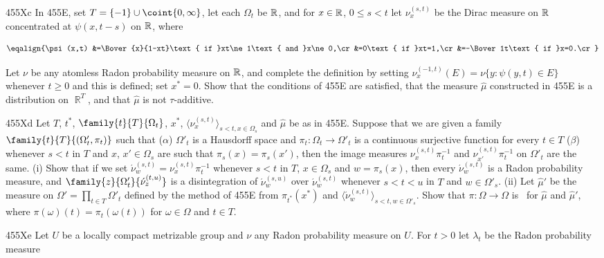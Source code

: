 {\spheader 455Xc
In 455E, set $T=\{-1\}\cup\coint{0,\infty}$, let each
$\Omega_t$ be $\Bbb R$, and for $x\in\Bbb R$,
$0\le s<t$ let $\nu_x^{(s,t)}$ be the Dirac measure on $\Bbb R$
concentrated at $\psi(x,t-s)$ on $\Bbb R$, where

$$\eqalign{\psi(x,t)
&=\Bover{x}{1-xt}\text{ if }xt\ne 1\text{ and }x\ne 0,\cr
&=0\text{ if }xt=1,\cr
&=-\Bover1t\text{ if }x=0.\cr}$$

\noindent Let $\nu$ be any atomless Radon probability measure on
$\Bbb R$, and complete the definition by setting
$\nu_x^{(-1,t)}(E)=\nu\{y:\psi(y,t)\in E\}$ whenever $t\ge 0$ and this is
defined;  set $x^*=0$.
Show that the conditions of 455E are satisfied, that the
measure $\hat\mu$ constructed in 455E is a distribution on $\BbbR^T$, and
that $\hat\mu$ is not $\tau$-additive.   

\spheader 455Xd Let $T$, $t^*$, $\family{t}{T}{\Omega_t}$, $x^*$,
$\langle\nu^{(s,t)}_x\rangle_{s<t,x\in\Omega_s}$ and
$\hat\mu$ be as in 455E.   Suppose that we are given a family
$\family{t}{T}{(\Omega'_t,\pi_t)}$ such
that ($\alpha$) $\Omega'_t$ is a Hausdorff space and
$\pi_t:\Omega_t\to\Omega'_t$ is a continuous surjective
function for every $t\in T$
($\beta$) whenever $s<t$ in $T$ and $x$, $x'\in\Omega_s$ are such that
$\pi_s(x)=\pi_s(x')$, then the image measures $\nu^{(s,t)}_x\pi_t^{-1}$
and $\nu^{(s,t)}_{x'}\pi_t^{-1}$ on $\Omega'_t$ are the same.
(i) Show that if we set $\acute\nu^{(s,t)}_w=\nu^{(s,t)}_x\pi_t^{-1}$
whenever $s<t$ in $T$, $x\in\Omega_s$ and $w=\pi_s(x)$,
then every $\acute\nu^{(s,t)}_w$ is a Radon probability measure, and
$\family{z}{\Omega'_t}{\acute\nu^{(t,u)}_z}$ is a disintegration of
$\acute\nu^{(s,u)}_w$ over $\acute\nu^{(s,t)}_w$ whenever $s<t<u$ in $T$
and $w\in\Omega'_s$.   (ii) Let $\hat\mu'$ be the measure on
$\Omega'=\prod_{t\in T}\Omega'_t$ defined by the method of 455E from
$\pi_{t^*}(x^*)$ and
$\langle\acute\nu^{(s,t)}_w\rangle_{s<t,w\in\Omega'_s}$.   Show that
$\pi:\Omega\to\Omega$ is \imp\ for $\hat\mu$ and $\hat\mu'$, where
$\pi(\omega)(t)=\pi_t(\omega(t))$ for $\omega\in\Omega$ and $t\in T$.

\spheader 455Xe Let $U$ be a locally compact metrizable group and $\nu$
any
Radon probability measure on $U$.   For $t>0$ let $\lambda_t$ be the Radon
probability measure

}
